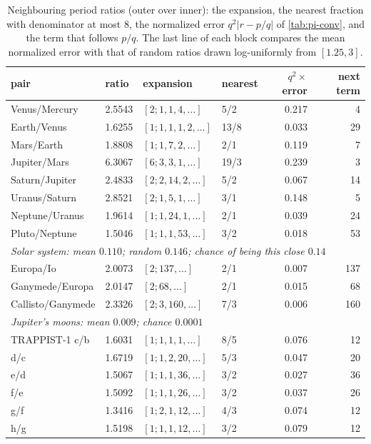 \begin{table}[ht]
\centering
\caption{Neighbouring period ratios (outer over inner): the expansion, the nearest fraction with
denominator at most $8$, the normalized error $q^{2}|r-p/q|$ of \cref{tab:pi-conv}, and the term that follows
$p/q$. The last line of each block compares the mean normalized error with that of random ratios drawn
log-uniformly from $[1.25,3]$.}\label{tab:18res}
\small
\begin{tabular}{llllrr}
\hline
pair & ratio & expansion & nearest & $q^{2}\times$error & next term\\
\hline
Venus/Mercury & 2.5543 & $[2;1,1,4,\ldots]$ & 5/2 & 0.217 & 4\\
Earth/Venus & 1.6255 & $[1;1,1,1,2,\ldots]$ & 13/8 & 0.033 & 29\\
Mars/Earth & 1.8808 & $[1;1,7,2,\ldots]$ & 2/1 & 0.119 & 7\\
Jupiter/Mars & 6.3067 & $[6;3,3,1,\ldots]$ & 19/3 & 0.239 & 3\\
Saturn/Jupiter & 2.4833 & $[2;2,14,2,\ldots]$ & 5/2 & 0.067 & 14\\
Uranus/Saturn & 2.8521 & $[2;1,5,1,\ldots]$ & 3/1 & 0.148 & 5\\
Neptune/Uranus & 1.9614 & $[1;1,24,1,\ldots]$ & 2/1 & 0.039 & 24\\
Pluto/Neptune & 1.5046 & $[1;1,1,53,\ldots]$ & 3/2 & 0.018 & 53\\
\multicolumn{6}{l}{\emph{Solar system: mean $0.110$; random $0.146$; chance of being this close $0.14$}}\\
\hline
Europa/Io & 2.0073 & $[2;137,\ldots]$ & 2/1 & 0.007 & 137\\
Ganymede/Europa & 2.0147 & $[2;68,\ldots]$ & 2/1 & 0.015 & 68\\
Callisto/Ganymede & 2.3326 & $[2;3,160,\ldots]$ & 7/3 & 0.006 & 160\\
\multicolumn{6}{l}{\emph{Jupiter's moons: mean $0.009$; chance $0.0001$}}\\
\hline
TRAPPIST-1 c/b & 1.6031 & $[1;1,1,1,\ldots]$ & 8/5 & 0.076 & 12\\
d/c & 1.6719 & $[1;1,2,20,\ldots]$ & 5/3 & 0.047 & 20\\
e/d & 1.5067 & $[1;1,1,36,\ldots]$ & 3/2 & 0.027 & 36\\
f/e & 1.5092 & $[1;1,1,26,\ldots]$ & 3/2 & 0.037 & 26\\
g/f & 1.3416 & $[1;2,1,12,\ldots]$ & 4/3 & 0.074 & 12\\
h/g & 1.5198 & $[1;1,1,12,\ldots]$ & 3/2 & 0.079 & 12\\

\end{tabular}
\end{table}
